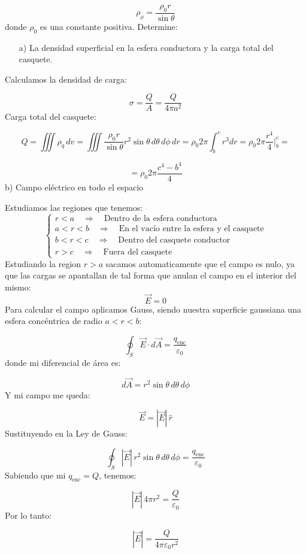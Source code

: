 \documentclass[a4paper,12pt]{article}
\begin{document}
\[
\rho_\rho = \frac{\rho_0 r}{\sin\theta}
\]
donde $\rho_0$ es una constante positiva. Determine:

\begin{enumerate}
    \item[a)] La densidad superficial en la esfera conductora y la carga total del casquete.
\end{enumerate}
\noindent
Calculamos la densidad de carga:

\[
\sigma = \frac{Q}{A} = \frac{Q}{4\pi a^2}
\]
Carga total del casquete:

\[
Q = \iiint \rho_q\, dv = \iiint \frac{\rho_0 r}{\sin\theta} r^2 \sin\theta\, d\theta\, d\phi\, dr 
= \rho_0 2\pi \int_{b}^{c} r^3 dr = \rho_0 2\pi \frac{r^4}{4} \Big|_{b}^{c} =
\]

\[
 = \rho_0 2\pi \frac{c^4 - b^4}{4}
\]
\newpage
\noindent
b) Campo eléctrico en todo el espacio

\medskip
\noindent
Estudiamos las regiones que tenemos:
\[
\begin{cases}
r < a \quad \Rightarrow \quad \text{Dentro de la esfera conductora} \\[10pt]
a < r < b \quad \Rightarrow \quad \text{En el vacío entre la esfera y el casquete} \\[10pt]
b < r < c \quad \Rightarrow \quad \text{Dentro del casquete conductor} \\[10pt]
r > c \quad \Rightarrow \quad \text{Fuera del casquete}
\end{cases}
\]
\noindent
Estudiando la region $r > a$ sacamos automaticamente que el campo es nulo, ya que las cargas se apantallan de tal forma que anulan el campo en el interior del mismo:
\[
\vec{E} = 0
\]
Para calcular el campo aplicamos Gauss, siendo nuestra superficie gaussiana una esfera concéntrica de radio $a < r < b$:

\[
\oint_{S} \vec{E} \cdot d\vec{A} = \frac{q_{\text{enc}}}{\varepsilon_0}
\]
donde mi diferencial de área es:

\[
d\vec{A} = r^2 \sin\theta\, d\theta\, d\phi
\]
Y mi campo me queda:

\[
\vec{E} = |\vec{E}|\, \hat{r}
\]
Sustituyendo en la Ley de Gauss:

\[
\oint_{S} |\vec{E}|\, r^2 \sin\theta\, d\theta\, d\phi = \frac{q_{\text{enc}}}{\varepsilon_0}
\]
Sabiendo que mi $q_{\text{enc}} = Q$, tenemos:

\[
|\vec{E}|\, 4\pi r^2 = \frac{Q}{\varepsilon_0}
\]
Por lo tanto:

\[
|\vec{E}| = \frac{Q}{4\pi \varepsilon_0 r^2}
\]
\end{document}

